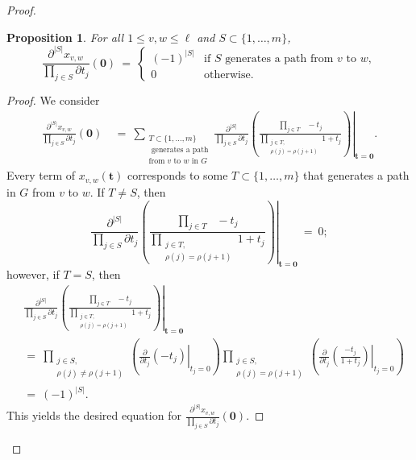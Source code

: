 \documentclass[12pt, reqno, oneside]{amsart}
\newtheorem{proposition}[corollary]{Proposition}
\numberwithin{equation}{section}
\begin{document}
\begin{proof}
\begin{proposition}\label{prop:component-derivative}
For all $1 \leq v, w \leq \ell$ and $S \subset \{1, \dots, m\}$,
\begin{equation}\label{eq:A-partitions}
\frac{\partial^{|S|}x_{v,w}}{\prod_{j \in S}\partial t_j}(\mathbf{0}) \ = \ \begin{cases}
    (-1)^{|S|} & \text{if } S \text{ generates a path from } v \text{ to } w, \\
    0 & \text{otherwise}.
\end{cases}
\end{equation}
\end{proposition}
\begin{proof}
We consider
\begin{align}\label{eq:component-derivative}
\frac{\partial^{|S|}x_{v,w}}{\prod_{j \in S}\partial t_j}(\mathbf{0}) \ &= \ \sum_{\substack{T \subset \{1, \dots, m\} \\ \text{ generates a path} \\ \text{from } v \text{ to } w \text{ in } G}} \left.\frac{\partial^{|S|}}{\prod_{j \in S}\partial t_j} \left(\frac{\prod\limits_{j \in T} \ \ \ -t_j}{\prod\limits_{\substack{j \in T, \\ \rho(j) = \rho(j+1)}} 1+t_j}\right)\right|_{\mathbf{t}=\mathbf{0}}.
\end{align}
Every term of $x_{v,w}(\mathbf{t})$ corresponds to some $T \subset \{1, \dots, m\}$ that generates a path in $G$ from $v$ to $w$. If $T \neq S$, then
\begin{equation}
\left.\frac{\partial^{|S|}}{\prod_{j \in S}\partial t_j} \left(\frac{\prod\limits_{j \in T} \ \ \ -t_j}{\prod\limits_{\substack{j \in T, \\ \rho(j) = \rho(j+1)}} 1+t_j}\right)\right|_{\mathbf{t}=\mathbf{0}} \ = \ 0;
\end{equation}
however, if $T = S$, then
\begin{align}
\nonumber
&\left.\frac{\partial^{|S|}}{\prod_{j \in S}\partial t_j} \left(\frac{\prod\limits_{j \in T} \ \ \ -t_j}{\prod\limits_{\substack{j \in T, \\ \rho(j) = \rho(j+1)}} 1+t_j}\right)\right|_{\mathbf{t}=\mathbf{0}} \\
\nonumber
&= \ \prod_{\substack{j \in S, \\ \rho(j) \neq \rho(j+1)}}\left(\left.\frac{\partial}{\partial t_j}(-t_j)\right|_{t_j=0}\right)\prod_{\substack{j \in S, \\ \rho(j) = \rho(j+1)}}\left(\left.\frac{\partial}{\partial t_j}\left(\frac{-t_j}{1+t_j}\right)\right|_{t_j=0}\right) \\
&= \ (-1)^{|S|}.
\end{align}
This yields the desired equation for $\frac{\partial^{|S|}x_{v,w}}{\prod_{j \in S}\partial t_j}(\mathbf{0})$.
\end{proof}


\end{proof}
\end{document}
